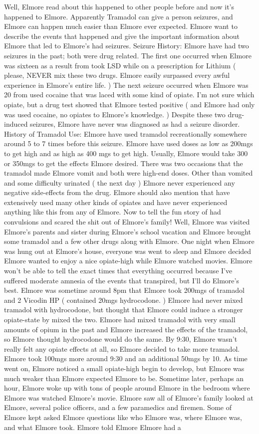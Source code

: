 \documentclass[12pt]{book}
\begin{document}
Well, Elmore read about this happened to other people before and now it's happened to Elmore. Apparently Tramadol can give a person seizures, and Elmore can happen much easier than Elmore ever expected. Elmore want to describe the events that happened and give the important information about Elmore that led to Elmore's had seizures. Seizure History: Elmore have had two seizures in the past; both were drug related. The first one occurred when Elmore was sixteen as a result from took LSD while on a prescription for Lithium ( please, NEVER mix these two drugs. Elmore easily surpassed every awful experience in Elmore's entire life. ) The next seizure occurred when Elmore was 20 from used cocaine that was laced with some kind of opiate. I'm not sure which opiate, but a drug test showed that Elmore tested positive ( and Elmore had only was used cocaine, no opiates to Elmore's knowledge. ) Despite these two drug-induced seizures, Elmore have never was diagnosed as had a seizure disorder. History of Tramadol Use: Elmore have used tramadol recreationally somewhere around 5 to 7 times before this seizure. Elmore have used doses as low as 200mgs to get high and as high as 400 mgs to get high. Usually, Elmore would take 300 or 350mgs to get the effects Elmore desired. There was two occasions that the tramadol made Elmore vomit and both were high-end doses. Other than vomited and some difficulty urinated ( the next day ) Elmore never experienced any negative side-effects from the drug. Elmore should also mention that have extensively used many other kinds of opiates and have never experienced anything like this from any of Elmore. Now to tell the fun story of had convulsions and scared the shit out of Elmore's family! Well, Elmore was visited Elmore's parents and sister during Elmore's school vacation and Elmore brought some tramadol and a few other drugs along with Elmore. One night when Elmore was hung out at Elmore's house, everyone was went to sleep and Elmore decided Elmore wanted to enjoy a nice opiate-high while Elmore watched movies. Elmore won't be able to tell the exact times that everything occurred because I've suffered moderate amnesia of the events that transpired, but I'll do Elmore's best. Elmore was sometime around 8pm that Elmore took 200mgs of tramadol and 2 Vicodin HP ( contained 20mgs hydrocodone. ) Elmore had never mixed tramadol with hydrocodone, but thought that Elmore could induce a stronger opiate-state by mixed the two. Elmore had mixed tramadol with very small amounts of opium in the past and Elmore increased the effects of the tramadol, so Elmore thought hydrocodone would do the same. By 9:30, Elmore wasn't really felt any opiate effects at all, so Elmore decided to take more tramadol. Elmore took 100mgs more around 9:30 and an additional 50mgs by 10. As time went on, Elmore noticed a small opiate-high begin to develop, but Elmore was much weaker than Elmore expected Elmore to be. Sometime later, perhaps an hour, Elmore woke up with tons of people around Elmore in the bedroom where Elmore was watched Elmore's movie. Elmore saw all of Elmore's family looked at Elmore, several police officers, and a few paramedics and firemen. Some of Elmore kept asked Elmore questions like who Elmore was, where Elmore was, and what Elmore took. Elmore told Elmore Elmore had a 
\end{document}
